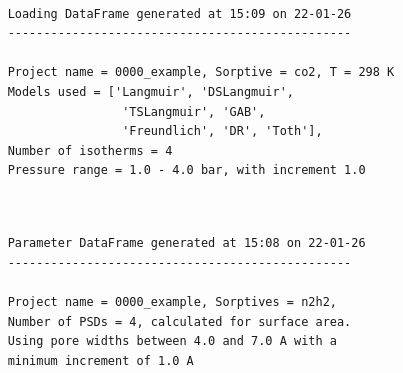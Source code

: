 \setlength{\originalVOffset}{\voffset}   
\setlength{\originalHOffset}{\hoffset}

\setlength{\voffset}{0cm}
\setlength{\hoffset}{0cm}

\setlength{\voffset}{\originalVOffset}
\setlength{\hoffset}{\originalHOffset}




\begin{subappendices}

\begin{figure}[h]
\centering
    \begin{verbatim}
        
    Loading DataFrame generated at 15:09 on 22-01-26
    ------------------------------------------------
    
    Project name = 0000_example, Sorptive = co2, T = 298 K
    Models used = ['Langmuir', 'DSLangmuir', 
                    'TSLangmuir', 'GAB', 
                    'Freundlich', 'DR', 'Toth'], 
    Number of isotherms = 4
    Pressure range = 1.0 - 4.0 bar, with increment 1.0
                
    \end{verbatim}
    \label{fig:loading_report}
    
    \centering
    \begin{verbatim}
    
    Parameter DataFrame generated at 15:08 on 22-01-26 
    ------------------------------------------------
    
    Project name = 0000_example, Sorptives = n2h2,
    Number of PSDs = 4, calculated for surface area.
    Using pore widths between 4.0 and 7.0 A with a 
    minimum increment of 1.0 A
                
    \end{verbatim}
    \label{fig:psd_report}
\end{figure}

\end{subappendices}